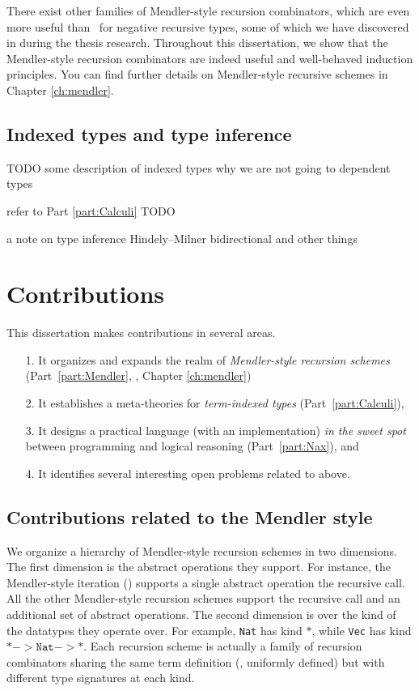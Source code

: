 There exist other families of Mendler-style recursion combinators,
which are even more useful than \MIt\ for negative recursive types,
some of which we have discovered in during the thesis research. Throughout
this dissertation, we show that the Mendler-style recursion combinators are
indeed useful and well-behaved induction principles. You can find
further details on Mendler-style recursive schemes in Chapter \ref{ch:mendler}.

\subsection{Indexed types and type inference}
\label{sec:intro:indexed}
TODO some description of indexed types
why we are not going to dependent types

refer to Part \ref{part:Calculi}
TODO

a note on type inference
Hindely--Milner
bidirectional and other things

\section{Contributions}\label{sec:intro:contrib}
This dissertation makes contributions in several areas.
\begin{itemize}
\item[1.]
It organizes and expands the realm of \emph{Mendler-style recursion schemes}
(Part~\ref{part:Mendler}, \ie, Chapter \ref{ch:mendler})

\item[2.] It establishes a meta-theories for \emph{term-indexed types}
        (Part~\ref{part:Calculi}),

\item[3.] It designs a practical language (with an implementation)
        \emph{in the sweet spot} between programming and logical reasoning
        (Part~\ref{part:Nax}), and

\item[4.] It identifies several interesting open problems related to above.
\end{itemize}

\subsection{Contributions related to the Mendler style}
We organize a hierarchy of Mendler-style recursion schemes in two dimensions.
The first dimension is the abstract operations they support. For instance,
the Mendler-style iteration (\MIt) supports a single abstract operation
the recursive call. All the other Mendler-style recursion schemes
support the recursive call and an additional set of abstract operations. 
The second dimension is over the kind of the datatypes they operate over.
For example, \texttt{Nat} has kind $*$, while \texttt{Vec}
has kind $* -> \mathtt{Nat} -> *$. Each recursion scheme is actually a
family of recursion combinators sharing the same term definition
(\ie, uniformly defined) but with different type signatures at each kind.

